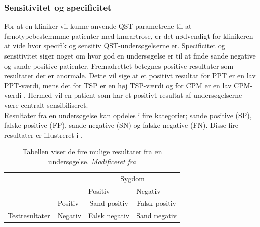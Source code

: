 \subsubsection{Sensitivitet og specificitet}
For at en kliniker vil kunne anvende QST-parametrene til at fænotypebestemmme patienter med knæartrose, er det nødvendigt for klinikeren at vide hvor specifik og sensitiv QST-undersøgelserne er. Specificitet og sensitivitet siger noget om hvor god en undersøgelse er til at finde sande negative og sande positive patienter. Fremadrettet betegnes positive resultater som resultater der er anormale. Dette vil sige at et positivt resultat for PPT er en lav PPT-værdi, mens det for TSP er en høj TSP-værdi og for CPM er en lav CPM-værdi \citep{Petersen2016}. Hermed vil en patient som har et positivt resultat af undersøgelserne være centralt sensibiliseret. \\
Resultater fra en undersøgelse kan opdeles i fire kategorier; sande positive (SP), falske positive (FP), sande negative (SN) og falske negative (FN). Disse fire resultater er illustreret i .

\begin{table}[]
\centering
\begin{tabular}{llcc}
\rowcolor[HTML]{C0C0C0} 
\cellcolor[HTML]{C0C0C0}                                 &         & \multicolumn{2}{c}{\cellcolor[HTML]{C0C0C0}Sygdom}        \\ \cline{2-4} 
\cellcolor[HTML]{C0C0C0}                                 &         & \multicolumn{1}{l}{Positiv} & \multicolumn{1}{l}{Negativ} \\
\cellcolor[HTML]{C0C0C0}                                 & Positiv & Sand positiv                & Falsk positiv               \\
\multirow{-4}{*}{\cellcolor[HTML]{C0C0C0}Testresultater} & Negativ & Falsk negativ               & Sand negativ               
\end{tabular}
\caption{Tabellen viser de fire mulige resultater fra en undersøgelse. \textit{Modificeret fra }}
\label{tab:pos_neg}
\end{table}

